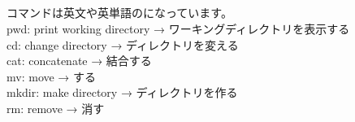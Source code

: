 \subsection{}
\label{英語と日本語の対応表}
コマンドは英文や英単語のになっています。\\
pwd: print working directory → ワーキングディレクトリを表示する\\
cd: change directory → ディレクトリを変える\\
cat: concatenate → 結合する\\
mv: move → する\\
mkdir: make directory → ディレクトリを作る\\
rm: remove → 消す\\
